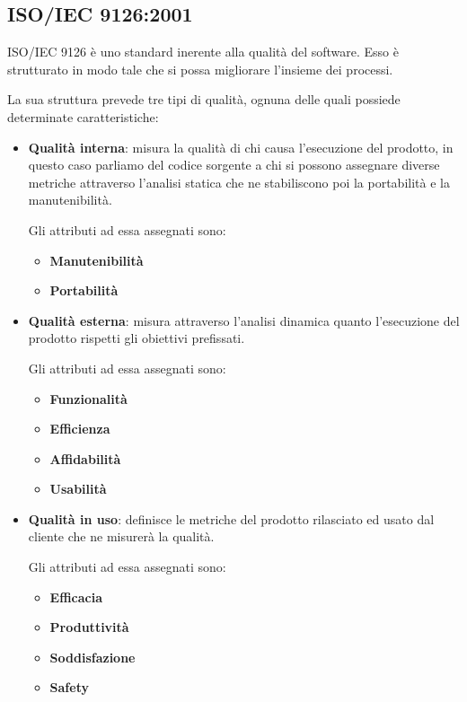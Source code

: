	\subsection{ISO/IEC 9126:2001}
	ISO/IEC 9126 è uno standard inerente alla qualità del software. Esso è strutturato in modo tale che si possa migliorare l'insieme dei processi.
	
	La sua struttura prevede tre tipi di qualità, ognuna delle quali possiede determinate caratteristiche:
	
	\begin{itemize}
		\item \textbf{Qualità interna}: misura la qualità di chi causa l'esecuzione del prodotto, in questo caso parliamo del codice sorgente a chi si possono assegnare diverse metriche attraverso l'analisi statica che ne stabiliscono poi la portabilità e la manutenibilità.
		
		Gli attributi ad essa assegnati sono:
		
		\begin{itemize}
			\item \textbf{Manutenibilità}
			\item \textbf{Portabilità}
		\end{itemize}
	
		\item \textbf{Qualità esterna}: misura attraverso l'analisi dinamica quanto l'esecuzione del prodotto rispetti gli obiettivi prefissati.
		
		Gli attributi ad essa assegnati sono:
		
			\begin{itemize}
			\item \textbf{Funzionalità}
			\item \textbf{Efficienza}
			\item \textbf{Affidabilità}
			\item \textbf{Usabilità}
		\end{itemize}
	
		\item \textbf{Qualità in uso}: definisce le metriche del prodotto rilasciato ed usato dal cliente che ne misurerà la qualità.
		
		Gli attributi ad essa assegnati sono:
		
		\begin{itemize}
			\item \textbf{Efficacia}
			\item \textbf{Produttività}
			\item \textbf{Soddisfazione}
			\item \textbf{Safety}
		\end{itemize}
	\end{itemize}

